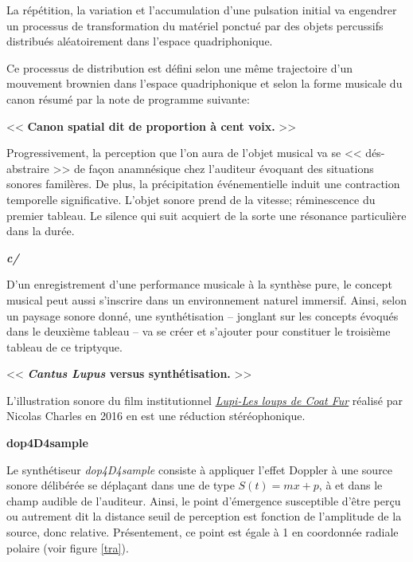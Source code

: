  La r\'{e}p\'{e}tition, la variation et l'accumulation d'une pulsation initial va engendrer un processus de transformation du mat\'{e}riel ponctu\'{e} par des objets percussifs distribu\'{e}s al\'{e}atoirement dans l'espace quadriphonique.
 
Ce processus de distribution est d\'{e}fini selon une m\^eme trajectoire d'un mouvement brownien dans l'espace quadriphonique et selon la forme musicale du canon r\'{e}sum\'{e} par la note de programme suivante:

\bigskip

 << \textbf{Canon spatial dit de proportion \`{a} cent voix.} >>
 
 \bigskip

 Progressivement, la perception que l'on aura de l'objet musical va se << d\'{e}s-abstraire >> de fa\c{c}on anamn\'{e}sique chez l'auditeur \'{e}voquant des situations sonores famil\`{e}res. 
De plus, la pr\'{e}cipitation \'{e}v\'{e}nementielle induit une contraction temporelle significative. L'objet sonore prend de la vitesse; r\'{e}minescence du premier tableau. Le silence qui suit acquiert de la sorte une r\'{e}sonance particuli\`{e}re dans la dur\'{e}e.

\bigskip
\bigskip

 \textbf{\textit{c/}}
 
 D'un enregistrement d'une performance musicale \`{a} la synth\`{e}se pure, le concept musical peut aussi s'inscrire dans un environnement naturel immersif. Ainsi, selon un paysage sonore donn\'{e}, une synth\'{e}tisation -- jonglant sur les concepts \'{e}voqu\'{e}s dans le deuxi\`{e}me tableau -- va se cr\'{e}er et s'ajouter pour constituer le troisi\`{e}me tableau de ce triptyque.     

\bigskip

  << \textbf{\textit{Cantus Lupus} versus synth\'{e}tisation.} >>
  
  \bigskip
  L'illustration sonore du film institutionnel \href{http://refugedesloups.org/video/version\%203\%20refuge\%20des\%20loups.mp4}{\textit{Lupi-Les loups de Coat Fur}} r\'ealis\'e par Nicolas Charles en 2016 en est une r\'eduction st\'er\'eophonique. 
  
  \bigskip
\bigskip
  \bigskip

\noindent \textbf{{\large dop4D4sample}}
\hrulefill
\label{dop}

  \bigskip

Le synth\'etiseur  \textsl{dop4D4sample} consiste \`a appliquer l'effet Doppler \`a une source sonore d\'elib\'er\'ee se d\'epla\c{c}ant dans une  de type $S(t)=m x +p$, \`a  et dans le champ audible de l'auditeur. Ainsi, le point d'\'emergence susceptible d'\^etre per\c{c}u ou autrement dit la distance seuil de perception est fonction de l'amplitude de la source, donc relative. Pr\'esentement, ce point est \'egale \`a 1 en coordonn\'ee radiale polaire (voir figure \ref{tra}). 

